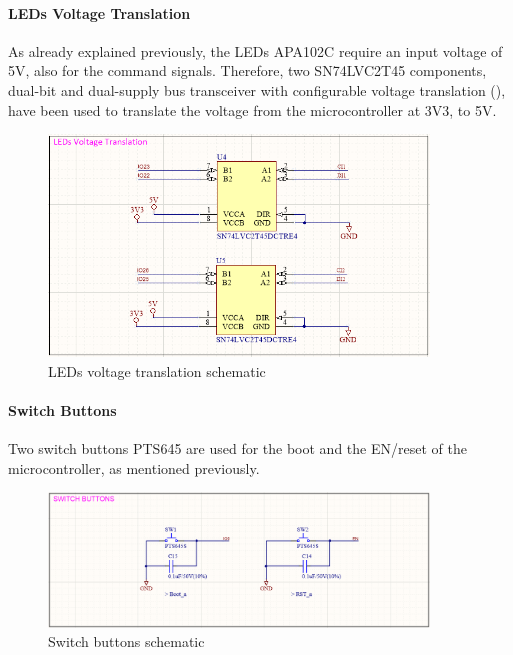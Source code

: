 \paragraph{LEDs Voltage Translation} As already explained previously, the LEDs APA102C require an input voltage of 5V, also for the command signals. Therefore, two SN74LVC2T45 components, dual-bit and dual-supply bus transceiver with configurable voltage translation (\cite{sn74lvc2t45datasheet}), have been used to translate the voltage from the microcontroller at 3V3, to 5V.

\begin{figure}[H]
    \centering
    \includegraphics[width=0.9\textwidth]{images/EE_LEDsVoltageTranslation2.PNG}
    \caption{LEDs voltage translation schematic}
    \label{fig:LEDsVoltageTranslation_schematic}
\end{figure}


\paragraph{Switch Buttons} Two switch buttons PTS645 are used for the boot and the EN/reset of the microcontroller, as mentioned previously.

\begin{figure}[H]
    \centering
    \includegraphics[width=0.9\textwidth]{images/EE_SwitchButtons.PNG}
    \caption{Switch buttons schematic}
    \label{fig:SwitchButtons_schematic}
\end{figure}


